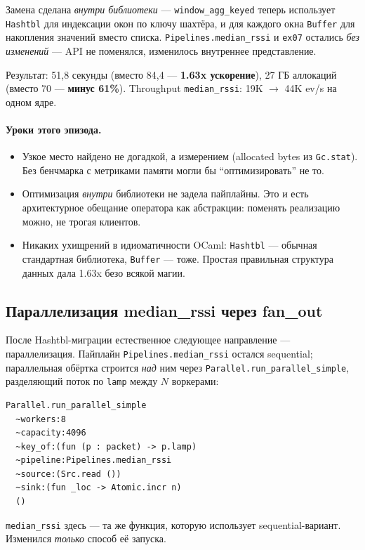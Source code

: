 Замена сделана \emph{внутри библиотеки} --- \texttt{window\_agg\_keyed}
теперь использует \texttt{Hashtbl} для индексации окон по ключу
шахтёра, и для каждого окна \texttt{Buffer} для накопления значений
вместо списка. \texttt{Pipelines.median\_rssi} и \texttt{ex07} остались
\emph{без изменений} --- API не поменялся, изменилось внутреннее
представление.

Результат: 51{,}8 секунды (вместо 84{,}4 --- \textbf{1.63x ускорение}),
27 ГБ аллокаций (вместо 70 --- \textbf{минус 61\%}). Throughput
\texttt{median\_rssi}: 19K $\to$ 44K ev/s на одном ядре.

\paragraph{Уроки этого эпизода.}

\begin{itemize}
\item Узкое место найдено не догадкой, а измерением (allocated bytes
из \texttt{Gc.stat}). Без бенчмарка с метриками памяти могли бы
``оптимизировать'' не то.
\item Оптимизация \emph{внутри} библиотеки не задела пайплайны.
Это и есть архитектурное обещание оператора как абстракции:
поменять реализацию можно, не трогая клиентов.
\item Никаких ухищрений в идиоматичности OCaml: \texttt{Hashtbl} ---
обычная стандартная библиотека, \texttt{Buffer} --- тоже. Простая
правильная структура данных дала 1.63x безо всякой магии.
\end{itemize}

\subsection{Параллелизация median\_rssi через fan\_out}

После Hashtbl-миграции естественное следующее направление ---
параллелизация. Пайплайн \texttt{Pipelines.median\_rssi} остался
sequential; параллельная обёртка строится \emph{над} ним через
\texttt{Parallel.run\_parallel\_simple}, разделяющий поток по
\texttt{lamp} между $N$ воркерами:

\begin{lstlisting}
Parallel.run_parallel_simple
  ~workers:8
  ~capacity:4096
  ~key_of:(fun (p : packet) -> p.lamp)
  ~pipeline:Pipelines.median_rssi
  ~source:(Src.read ())
  ~sink:(fun _loc -> Atomic.incr n)
  ()
\end{lstlisting}

\texttt{median\_rssi} здесь --- та же функция, которую использует
sequential-вариант. Изменился \emph{только} способ её запуска.

